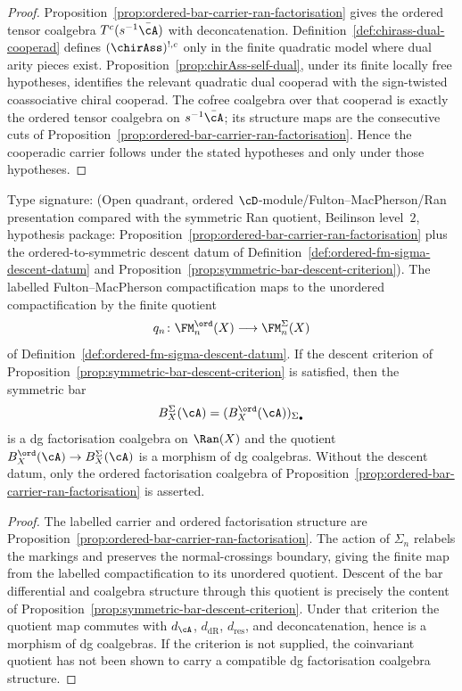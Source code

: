 \begin{proof}
Proposition~\ref{prop:ordered-bar-carrier-ran-factorisation} gives the
ordered tensor coalgebra \(T^c(s^{-1}\bar\cA)\) with deconcatenation.
Definition~\ref{def:chirass-dual-cooperad} defines
\((\chirAss)^{!,c}\) only in the finite quadratic model where dual
arity pieces exist.
Proposition~\ref{prop:chirAss-self-dual}, under its finite locally
free hypotheses, identifies the relevant quadratic dual cooperad with
the sign-twisted coassociative chiral cooperad. The cofree coalgebra
over that cooperad is exactly the ordered tensor coalgebra on
\(s^{-1}\bar\cA\); its structure maps are the consecutive cuts of
Proposition~\ref{prop:ordered-bar-carrier-ran-factorisation}. Hence
the cooperadic carrier follows under the stated hypotheses and only
under those hypotheses.
\end{proof}

\begin{theorem}
\label{thm:ordered-bar-operadic-ran-descent}
Type signature: \textup{(}Open quadrant, ordered
$\cD$-module/Fulton--MacPherson/Ran presentation compared with the
symmetric Ran quotient, Beilinson level~$2$, hypothesis package:
Proposition~\ref{prop:ordered-bar-carrier-ran-factorisation} plus the
ordered-to-symmetric descent datum of
Definition~\ref{def:ordered-fm-sigma-descent-datum} and
Proposition~\ref{prop:symmetric-bar-descent-criterion}\textup{)}.
The labelled Fulton--MacPherson compactification maps to the unordered
compactification by the finite quotient
\[
q_n\colon
\FM^{\ord}_n(X)\longrightarrow \FM^\Sigma_n(X)
\]
of Definition~\ref{def:ordered-fm-sigma-descent-datum}.
If the descent criterion of
Proposition~\ref{prop:symmetric-bar-descent-criterion} is satisfied,
then the symmetric bar
\[
B^\Sigma_X(\cA)=(B_X^{\ord}(\cA))_{\Sigma_\bullet}
\]
is a dg factorisation coalgebra on $\Ran(X)$ and the quotient
$B_X^{\ord}(\cA)\to B^\Sigma_X(\cA)$ is a morphism of dg coalgebras.
Without the descent datum, only the ordered factorisation coalgebra of
Proposition~\ref{prop:ordered-bar-carrier-ran-factorisation} is
asserted.
\end{theorem}

\begin{proof}
The labelled carrier and ordered factorisation structure are
Proposition~\ref{prop:ordered-bar-carrier-ran-factorisation}. The
action of $\Sigma_n$ relabels the markings and preserves the
normal-crossings boundary, giving the finite map from the labelled
compactification to its unordered quotient. Descent of the bar
differential and coalgebra structure through this quotient is precisely
the content of
Proposition~\ref{prop:symmetric-bar-descent-criterion}. Under that
criterion the quotient map commutes with $d_\cA$, $d_{\mathrm{dR}}$,
$d_{\mathrm{res}}$, and deconcatenation, hence is a morphism of dg
coalgebras. If the criterion is not supplied, the coinvariant quotient
has not been shown to carry a compatible dg factorisation coalgebra
structure.
\end{proof}


